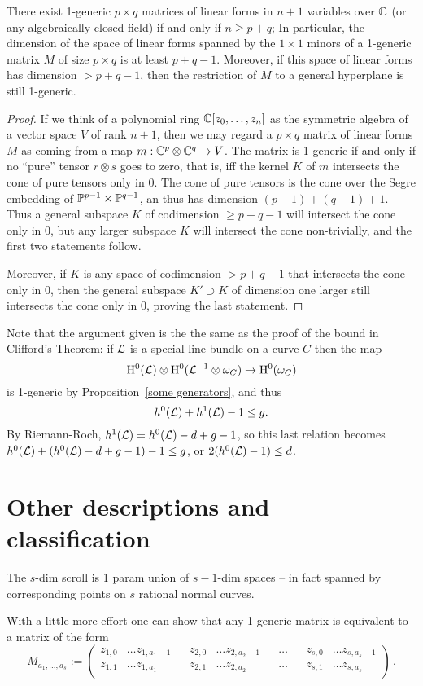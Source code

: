 \begin{lemma} \label{size of 1-generic}
There exist 1-generic $p\times q$ matrices of linear forms in $n+1$ variables over $\CC$ (or any algebraically closed field) if and only if $n\geq p+q$;
In particular, the dimension of the space of linear forms spanned by the $1\times 1$ minors of a  1-generic matrix $M$ of size $p\times q$ is at least $p+q-1$. Moreover, if this space of linear forms has dimension $>p+q-1$, then the restriction of $M$ to a general hyperplane is still 1-generic.
\end{lemma}

\begin{proof}
If we think of a polynomial ring $\CC[z_0,\dots,z_n]$ as the symmetric algebra
of a vector space $V$ of rank $n+1$, then we may regard a $p\times q$ matrix of
linear forms $M$ as coming from a map $m: \CC^{p}\otimes \CC^{q}\to V$. The matrix is 1-generic
if and only if no ``pure'' tensor $r\otimes s$ goes to zero, that is, iff the kernel $K$ of $m$ intersects the cone of
pure tensors only in 0. The cone of pure tensors is the cone over the Segre embedding of $\PP^{p-1}\times \PP^{q-1}$, 
an thus has dimension $(p-1)+(q-1)+1$. Thus a general subspace $K$ of codimension $\geq p+q-1$ will intersect the cone
only in 0, but any larger subspace $K$ will intersect the cone non-trivially,  and the first two statements follow.

Moreover, if $K$ is any space of codimension $>p+q-1$ that intersects the cone only in 0, then the general subspace $K'\supset K$
of dimension one larger still intersects the cone only in 0, proving the last statement.
\end{proof}

Note that the argument given is the the same as the proof of the bound in Clifford's Theorem: if $\cL$ is a special
line bundle on a curve $C$ then the map 
$$
\HH^0(\cL) \otimes \HH^0(\cL^{-1}\otimes \omega_C) \to \HH^0 (\omega_C)
$$
is 1-generic by Proposition~\ref{some generators}, and thus
$$
h^0(\cL)+h^1(\cL)-1 \leq g.
$$
By Riemann-Roch,  $h^1(\cL) = h^0(\cL) -d+g-1$, so this last relation becomes
$h^0(\cL)+(h^0(\cL) -d+g-1) -1 \leq g$, or $2(h^0(\cL)-1) \leq d$.


\section{Other descriptions and classification}

The $s$-dim scroll is 1 param union of 
$s-1$-dim spaces -- in fact spanned by
corresponding points on $s$ rational normal curves.
\begin{fact}
 With a little more effort one can show that any
 1-generic matrix is equivalent to a matrix of the 
 form
 $$
 M_{a_{1}, \dots, a_{s}} := 
\begin{pmatrix}
 z_{1,0}& \dots z_{1,a_{1}-1}&&
 z_{2,0}& \dots z_{2,a_{2}-1}&&\dots&&
 z_{s,0}& \dots z_{s,a_{s}-1}\\
  z_{1,1}& \dots z_{1,a_{1}}&&
 z_{2,1}& \dots z_{2,a_{2}}&&\dots&&
 z_{s,1}& \dots z_{s,a_{s}}\\
\end{pmatrix}\,.
$$
\end{fact}

